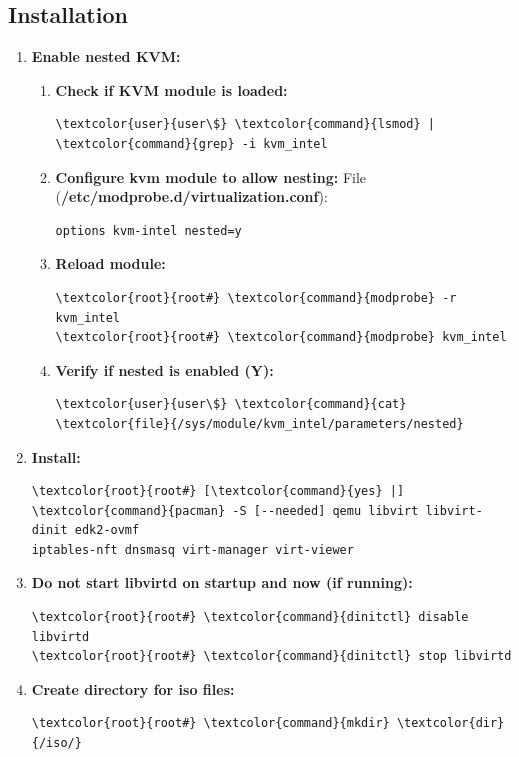 \documentclass[10pt, a4paper, onecolumn, oneside, titlepage, openany]{book}
\begin{document}
\subsection{Installation}
\begin{enumerate}
    \item \textbf{Enable nested KVM:}
    \begin{enumerate}
        \item \textbf{Check if KVM module is loaded:}
\begin{Verbatim}[commandchars=\\\{\}]
\textcolor{user}{user\$} \textcolor{command}{lsmod} | \textcolor{command}{grep} -i kvm_intel
\end{Verbatim}        
        \item \textbf{Configure kvm module to allow nesting:}
\newline File (\textbf{\textcolor{file}{/etc/modprobe.d/virtualization.conf}}):
\begin{Verbatim}[commandchars=\\\{\}]
options kvm-intel nested=y
\end{Verbatim}
        \item \textbf{Reload module:}
\begin{Verbatim}[commandchars=\\\{\}]
\textcolor{root}{root#} \textcolor{command}{modprobe} -r kvm_intel
\textcolor{root}{root#} \textcolor{command}{modprobe} kvm_intel
\end{Verbatim}   
        \item \textbf{Verify if nested is enabled (Y):}
\begin{Verbatim}[commandchars=\\\{\}]
\textcolor{user}{user\$} \textcolor{command}{cat} \textcolor{file}{/sys/module/kvm_intel/parameters/nested}
\end{Verbatim}
    \end{enumerate}
    \item \textbf{Install:}
\begin{Verbatim}[commandchars=\\\{\}]
\textcolor{root}{root#} [\textcolor{command}{yes} |] \textcolor{command}{pacman} -S [--needed] qemu libvirt libvirt-dinit edk2-ovmf
iptables-nft dnsmasq virt-manager virt-viewer
\end{Verbatim}
    \item \textbf{Do not start libvirtd on startup and now (if running):}
\begin{Verbatim}[commandchars=\\\{\}]
\textcolor{root}{root#} \textcolor{command}{dinitctl} disable libvirtd
\textcolor{root}{root#} \textcolor{command}{dinitctl} stop libvirtd
\end{Verbatim}
    \item \textbf{Create directory for iso files:}
\begin{Verbatim}[commandchars=\\\{\}]
\textcolor{root}{root#} \textcolor{command}{mkdir} \textcolor{dir}{/iso/}
\end{Verbatim}
\end{enumerate}
\end{document}
